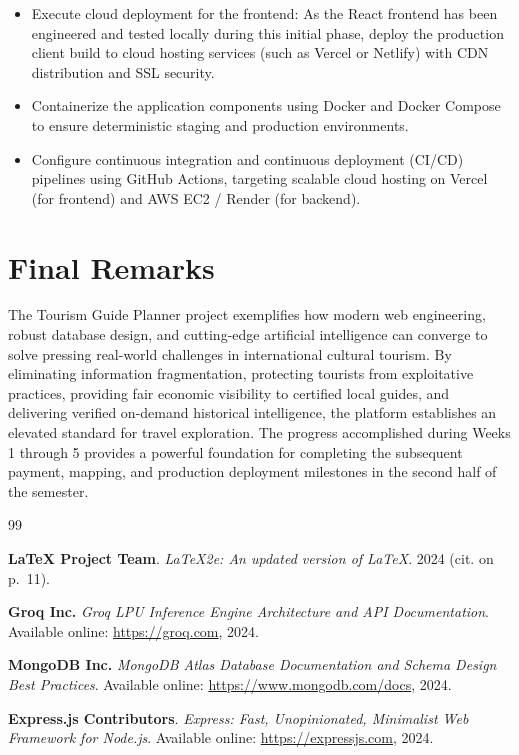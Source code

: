 \documentclass[12pt,a4paper,twoside,openright]{report}
\begin{document}
\begin{enumerate}[leftmargin=*]
\begin{itemize}
        \item Execute cloud deployment for the frontend: As the React frontend has been engineered and tested locally during this initial phase, deploy the production client build to cloud hosting services (such as Vercel or Netlify) with CDN distribution and SSL security.
        \item Containerize the application components using Docker and Docker Compose to ensure deterministic staging and production environments.
        \item Configure continuous integration and continuous deployment (CI/CD) pipelines using GitHub Actions, targeting scalable cloud hosting on Vercel (for frontend) and AWS EC2 / Render (for backend).
    \end{itemize}
\end{enumerate}

\section{Final Remarks}

The Tourism Guide Planner project exemplifies how modern web engineering, robust database design, and cutting-edge artificial intelligence can converge to solve pressing real-world challenges in international cultural tourism. By eliminating information fragmentation, protecting tourists from exploitative practices, providing fair economic visibility to certified local guides, and delivering verified on-demand historical intelligence, the platform establishes an elevated standard for travel exploration. The progress accomplished during Weeks 1 through 5 provides a powerful foundation for completing the subsequent payment, mapping, and production deployment milestones in the second half of the semester.

\cleardoublepage

\begin{thebibliography}{99}

\textbf{LaTeX Project Team}.
\textit{LaTeX2e: An updated version of LaTeX}.
2024 (cit. on p.~11).

\textbf{Groq Inc.}
\textit{Groq LPU Inference Engine Architecture and API Documentation}.
Available online: \url{https://groq.com}, 2024.

\textbf{MongoDB Inc.}
\textit{MongoDB Atlas Database Documentation and Schema Design Best Practices}.
Available online: \url{https://www.mongodb.com/docs}, 2024.

\textbf{Express.js Contributors}.
\textit{Express: Fast, Unopinionated, Minimalist Web Framework for Node.js}.
Available online: \url{https://expressjs.com}, 2024.

\end{thebibliography}
\end{document}
